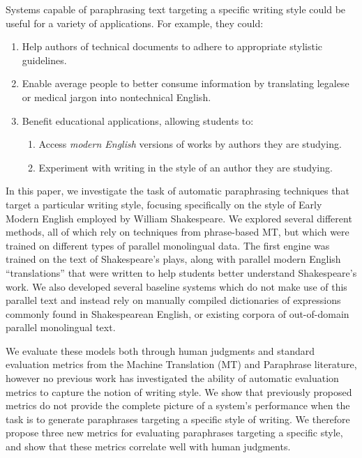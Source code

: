 \documentclass[10pt,a5paper,twoside]{article}
\begin{document}

Systems capable of paraphrasing text targeting a specific writing style could be useful for a variety of applications.  For example, they could:
\begin{enumerate}
  \item Help authors of technical documents to adhere to appropriate stylistic guidelines.  
  \item Enable average people to better consume information by translating legalese or medical jargon into nontechnical English.  
  \item Benefit educational applications, allowing students to:
    \begin{enumerate}
    \item Access \emph{modern English} versions of works by authors they are studying.
    \item Experiment with writing in the style of an author they are studying.
    \end{enumerate}
\end{enumerate}

In this paper, we investigate the task of automatic paraphrasing techniques that target a particular writing style, focusing specifically on the style of Early Modern English employed by William Shakespeare.
We explored several different methods, all of which rely on techniques from phrase-based MT, but which were trained on different types of parallel monolingual data.  The first engine was trained on the text of Shakespeare’s plays, along with parallel modern English “translations” that were written to help students better understand Shakespeare's work.  
We also developed several
baseline systems which do not make use of this parallel text and instead rely on manually compiled dictionaries of expressions commonly found in Shakespearean English, or existing
corpora of out-of-domain parallel monolingual text.

We evaluate these models both through human judgments and standard evaluation metrics from the Machine Translation (MT) and Paraphrase literature, however no previous work has investigated the ability of automatic
evaluation metrics to capture the notion of writing style.  
We show that previously proposed metrics do not provide the complete picture of a system's performance when the task is to generate paraphrases
targeting a specific style of writing.  We therefore propose three new metrics for evaluating paraphrases targeting a specific style, and 
show that these metrics correlate well with human judgments.
\end{document}
